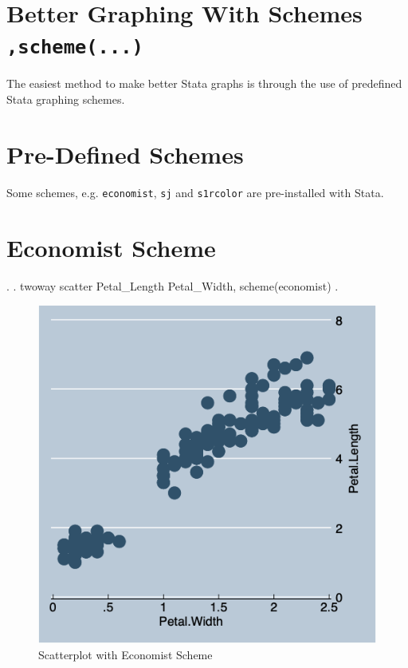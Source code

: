 \documentclass[]{article}
\begin{document}
\hypertarget{better-graphing-with-schemes-scheme...}{%
\section{\texorpdfstring{Better Graphing With Schemes
\texttt{,scheme(...)}}{Better Graphing With Schemes ,scheme(...)}}\label{better-graphing-with-schemes-scheme...}}

The easiest method to make better Stata graphs is through the use of
predefined Stata graphing schemes.

\hypertarget{pre-defined-schemes}{%
\section{Pre-Defined Schemes}\label{pre-defined-schemes}}

Some schemes, e.g. \texttt{economist}, \texttt{sj} and \texttt{s1rcolor}
are pre-installed with Stata.

\hypertarget{economist-scheme}{%
\section{Economist Scheme}\label{economist-scheme}}

\begin{stlog}
. 
. twoway scatter Petal_Length Petal_Width, scheme(economist)
{\smallskip}
. 
\end{stlog}

\begin{stlog}


{\smallskip}

\end{stlog}

\begin{figure}
\centering
\includegraphics[width=0.75\linewidth]{econscatter.png}
\caption{Scatterplot with Economist Scheme}
\end{figure}
\end{document}
